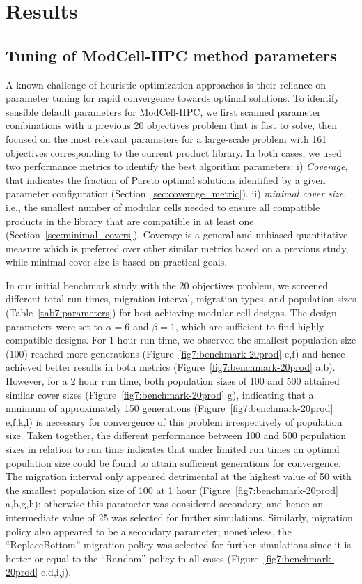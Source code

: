 {\section{Results}

\subsection{Tuning of ModCell-HPC method parameters}
A known challenge of heuristic optimization approaches is their reliance on parameter tuning for rapid convergence towards optimal solutions.
To identify sensible default parameters for ModCell-HPC, we first scanned parameter combinations with a previous\citep{garcia2019} 20 objectives problem that is fast to solve, then focused on the most relevant parameters for a large-scale problem with 161 objectives corresponding to the current product library.
In both cases, we used two performance metrics to identify the best algorithm parameters:
i) \emph{Coverage}, that indicates the fraction of Pareto optimal solutions identified by a given parameter configuration (Section~\ref{sec:coverage_metric}).
ii) \emph{minimal cover size}, i.e., the smallest number of modular cells needed to ensure all compatible products in the library that are compatible in at least one (Section~\ref{sec:minimal_covers}).
Coverage is a general and unbiased quantitative measure which is preferred over other similar metrics based on a previous study,\citep{garcia2019c} while minimal cover size is based on practical goals.

In our initial benchmark study with the 20 objectives problem, we screened different total run times, migration interval, migration types, and population sizes (Table~\ref{tab7:parameters}) for best achieving modular cell designs.
The design parameters were set to $\alpha=6$ and $\beta=1$, which are sufficient to find highly compatible designs.\citep{garcia2019d}
For 1 hour run time, we observed the smallest population size (100) reached more generations (Figure~\ref{fig7:benchmark-20prod} e,f) and hence achieved better results in both metrics (Figure~\ref{fig7:benchmark-20prod} a,b). However, for a 2 hour run time, both population sizes of 100 and 500 attained similar cover sizes (Figure~\ref{fig7:benchmark-20prod} g), indicating that a minimum of approximately 150 generations (Figure~\ref{fig7:benchmark-20prod} e,f,k,l) is necessary for convergence of this problem irrespectively of population size.
Taken together, the different performance between 100 and 500 population sizes in relation to run time indicates that under limited run times an optimal population size could be found to attain sufficient generations for convergence.
The migration interval only appeared detrimental at the highest value of 50 with the smallest population size of 100 at 1 hour (Figure~\ref{fig7:benchmark-20prod} a,b,g,h); otherwise this parameter was considered secondary, and hence an intermediate value of 25 was selected for further simulations.
Similarly, migration policy also appeared to be a secondary parameter;
nonetheless, the ``ReplaceBottom'' migration policy was selected for further simulations since it is better or equal to the ``Random'' policy in all cases (Figure~\ref{fig7:benchmark-20prod} c,d,i,j).

}
